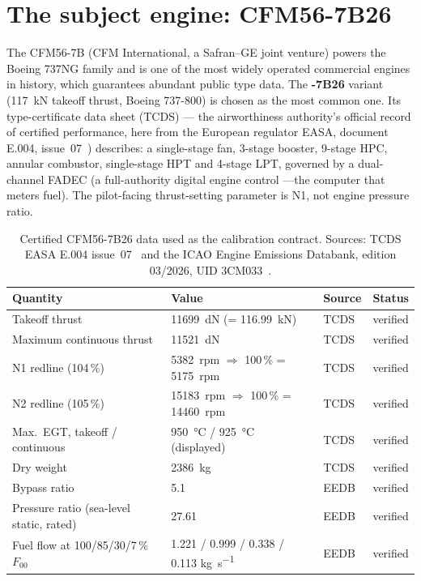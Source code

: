 \section{The subject engine: CFM56-7B26}
\label{sec:engine}

The CFM56-7B (CFM International, a Safran--GE joint venture) powers the Boeing 737NG family and
is one of the most widely operated commercial engines in history, which guarantees abundant
public type data. The \textbf{-7B26} variant (\SI{117}{\kilo\newton} takeoff thrust, Boeing
737-800) is chosen as the most common one. Its type-certificate data sheet (TCDS) --- the
airworthiness authority's official record of certified performance, here from the European
regulator EASA, document E.004,
issue~07~\cite{EASA2023}) describes: a single-stage fan, 3-stage booster, 9-stage HPC, annular
combustor, single-stage HPT and 4-stage LPT, governed by a dual-channel FADEC (a full-authority
digital engine control ---the computer that meters fuel). The pilot-facing thrust-setting
parameter is N1, not engine pressure ratio.

\begin{table}[htbp]
  \centering\small
  \caption{Certified CFM56-7B26 data used as the calibration contract. Sources: TCDS EASA E.004
  issue~07~\cite{EASA2023} and the ICAO Engine Emissions Databank, edition 03/2026, UID
  3CM033~\cite{ICAO2026}.}
  \label{tab:tcds}
  \begin{tabular}{llll}
    \toprule
    Quantity & Value & Source & Status \\
    \midrule
    Takeoff thrust & \SI{11699}{\deca\newton} (= \SI{116.99}{\kilo\newton}) & TCDS & verified \\
    Maximum continuous thrust & \SI{11521}{\deca\newton} & TCDS & verified \\
    N1 redline (104\,\%) & \SI{5382}{rpm} $\Rightarrow$ 100\,\% = \SI{5175}{rpm} & TCDS & verified \\
    N2 redline (105\,\%) & \SI{15183}{rpm} $\Rightarrow$ 100\,\% = \SI{14460}{rpm} & TCDS & verified \\
    Max.\ EGT, takeoff / continuous & \SI{950}{\degreeCelsius} / \SI{925}{\degreeCelsius} (displayed) & TCDS & verified \\
    Dry weight & \SI{2386}{\kilo\gram} & TCDS & verified \\
    Bypass ratio & 5.1 & EEDB & verified \\
    Pressure ratio (sea-level static, rated) & 27.61 & EEDB & verified \\
    Fuel flow at 100/85/30/7\,\% $F_{00}$ & 1.221 / 0.999 / 0.338 / 0.113 \si{\kilo\gram\per\second} & EEDB & verified \\
    \bottomrule
  \end{tabular}
\end{table}

